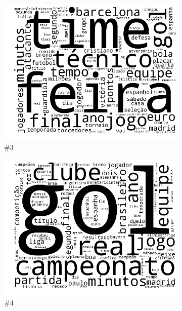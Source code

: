 \documentclass[
    12pt,                %
    oneside,            %
    a4paper,            %
    english,            %
    brazil                %
    ]{abntex2ppgsi}
\begin{document}
\begin{figure}[H]
\begin{subfigure}[b]{0.15\textwidth}
        \includegraphics[width=\textwidth]{img/ovnmtf-nc-3-tc-3.png}
        \caption{\#3}
    \end{subfigure}
    \begin{subfigure}[b]{0.15\textwidth}
        \includegraphics[width=\textwidth]{img/ovnmtf-nc-3-tc-4.png}
        \caption{\#4}
    \end{subfigure}
    \begin{subfigure}[b]{0.15\textwidth}

\end{subfigure}
\end{figure}
\end{document}
